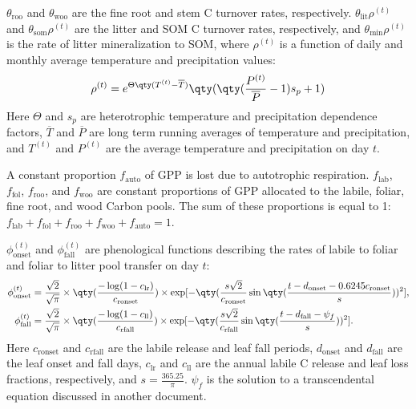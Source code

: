 \documentclass{article}
\begin{document}
			$\theta_\text{roo}$ and $\theta_\text{woo}$ are the fine root and stem C turnover rates, respectively.  $\theta_\text{lit} \rho^{(t)}$ and $\theta_\text{som} \rho^{(t)}$ are the litter and SOM C turnover rates, respectively, and $\theta_\text{min} \rho^{(t)}$ is the rate of litter mineralization to SOM, where $\rho^{(t)}$ is a function of daily and monthly average temperature and precipitation values:
			\begin{align}
				\rho^{(t)} = e^{\Theta\qty(T^{(t)} - \overline{T})}\qty(\qty(\frac{P^{(t)}}{\overline{P}}-1)s_p+1)
			\end{align}
			Here $\Theta$ and $s_p$ are heterotrophic temperature and precipitation dependence factors, $\overline{T}$ and $\overline{P}$ are long term running averages of temperature and precipitation, and $T^{(t)}$ and $P^{(t)}$ are the average temperature and precipitation on day $t$.

			A constant proportion $f_\text{auto}$ of GPP is lost due to autotrophic respiration.  $f_\text{lab}$, $f_\text{fol}$, $f_\text{roo}$, and $f_\text{woo}$ are constant proportions of GPP allocated to the labile, foliar, fine root, and wood Carbon pools.  The sum of these proportions is equal to 1: $f_\text{lab} + f_\text{fol} + f_\text{roo} + f_\text{woo} + f_\text{auto} = 1$.

			$\phi_\text{onset}^{(t)}$ and $\phi_\text{fall}^{(t)}$ are phenological functions describing the rates of labile to foliar and foliar to litter pool transfer on day $t$:
			\begin{align}
				\phi_\text{onset}^{(t)} &= \frac{\sqrt{2}}{\sqrt{\pi}}\times\qty(\frac{-\log(1-c_\text{lr})}{c_\text{ronset}})\times\exp[-\qty(\frac{s\sqrt{2}}{c_\text{ronset}}\sin\qty(\frac{t-d_\text{onset}-0.6245c_\text{ronset}}{s}))^2],\\
				\phi_\text{fall}^{(t)} &= \frac{\sqrt{2}}{\sqrt{\pi}}\times\qty(\frac{-\log(1-c_\text{ll})}{c_\text{rfall}})\times\exp[-\qty(\frac{s\sqrt{2}}{c_\text{rfall}}\sin\qty(\frac{t - d_\text{fall} - \psi_f}{s}))^2].
			\end{align}
			Here $c_\text{ronset}$ and $c_\text{rfall}$ are the labile release and leaf fall periods, $d_\text{onset}$ and $d_\text{fall}$ are the leaf onset and fall days, $c_\text{lr}$ and $c_\text{ll}$ are the annual labile C release and leaf loss fractions, respectively, and $s = \frac{365.25}{\pi}$.  $\psi_f$ is the solution to a transcendental equation discussed {\color{red}in another document}.
\end{document}

